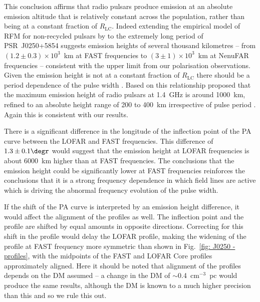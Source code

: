 This conclusion affirms that radio pulsars produce emission at an absolute emission altitude that is relatively constant across the population, rather than being at a constant fraction of $R_\mathrm{LC}$. Indeed extending the empirical model of RFM for non-recycled pulsars by \citet{KGxx2003} to the extremely long period of PSR~J0250+5854 suggests emission heights of several thousand kilometres -- from $(1.2\pm0.3)\times 10^3$~km at FAST frequencies to $(3\pm1)\times10^3$~km at NenuFAR frequencies -- consistent with the upper limit from our polarisation observations. Given the emission height is not at a constant fraction of $R_\mathrm{LC}$ there should be a period dependence of the pulse width \citep[e.g.][]{Rxxx1993}. Based on this relationship \citet{KJxx2007} proposed that the maximum emission height of radio pulsars at 1.4~GHz is around 1000~km, refined to an absolute height range of 200 to 400~km irrespective of pulse period \citep{JKxx2019, JSKx2020}. Again this is consistent with our results.

There is a significant difference in the longitude of the inflection point of the PA curve between the LOFAR and FAST frequencies. This difference of $1.3\pm0.1\degr$ would suggest that the emission height at LOFAR frequencies is about 6000~km higher than at FAST frequencies. The conclusions that the emission height could be significantly lower at FAST frequencies reinforces the conclusions that it is a strong frequency dependence in which field lines are active which is driving the abnormal frequency evolution of the pulse width. 

If the shift of the PA curve is interpreted by an emission height difference, it would affect the alignment of the profiles as well. The inflection point and the profile are shifted by equal amounts in opposite directions. Correcting for this shift in the profile would delay the LOFAR profile, making the widening of the profile at FAST frequency more symmetric than shown in Fig.~\ref{fig: J0250 - profiles}, with the midpoints of the FAST and LOFAR Core profiles approximately aligned. Here it should be noted that alignment of the profiles depends on the DM assumed -- a change in the DM of $\sim$0.4~cm$^{-3}$~pc would produce the same results, although the DM is known to a much higher precision than this and so we rule this out.

















